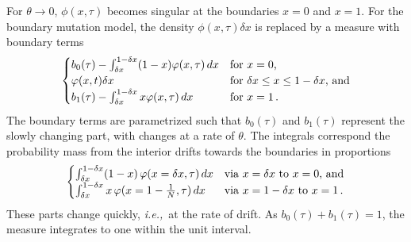 \documentclass[preprint]{elsarticle}
\newcommand\ie{{\it i.e.,}}
\begin{document}
{For $\theta\to 0$, $\phi(x,\tau)$ becomes singular at the boundaries $x=0$ and $x=1$. For the boundary mutation model, the density $\phi(x,\tau)\delta x$ is replaced by a measure with boundary terms
\begin{equation}\label{eq:measure}
\begin{cases}
b_0(\tau)-\int_{\delta x}^{1-\delta x}(1-x)\varphi(x,\tau)\,dx &\text{for  $x=0$,}\\
\varphi(x,t)\delta x &\text{for $\delta x \leq x \leq 1-\delta x$, and}\\
b_1(\tau)-\int_{\delta x}^{1-\delta x}x\varphi(x,\tau)\,dx &\text{for  $x=1$\,.}\\
\end{cases}
\end{equation}
The boundary terms are parametrized such that $b_0(\tau)$ and $b_1(\tau)$ represent the slowly changing part, with changes at a rate of $\theta$. The integrals correspond the probability mass from the interior drifts towards the boundaries in proportions
\begin{align}
  \begin{cases}
    \int_{\delta x}^{1-\delta x}(1-x)\,\varphi(x=\delta x,\tau)\,dx         &\text{via $x=\delta x$ to $x=0$, and}\\
    \int_{\delta x}^{1-\delta x}x\,\varphi(x=1-\frac1N,\tau) \,dx        & \text{via $x=1-\delta x$ to $x=1$\,.}
\end{cases}
\end{align}
These parts change quickly, \ie\ at the rate of drift. As $b_0(\tau)+b_1(\tau)=1$, the measure integrates to one within the unit interval. 

}
\end{document}

